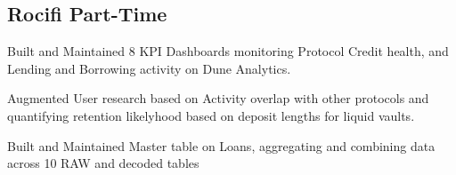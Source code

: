 \subsection*{Rocifi \hfill Part-Time} 
    \begin{zitemize}
        \item Built and Maintained 8 KPI Dashboards monitoring Protocol Credit health, and Lending and Borrowing activity on Dune Analytics.
        \item Augmented User research based on Activity overlap with other protocols and quantifying retention likelyhood based on deposit lengths for liquid vaults.
        \item Built and Maintained Master table on Loans, aggregating and combining data across 10 RAW and decoded tables
    \end{zitemize}

